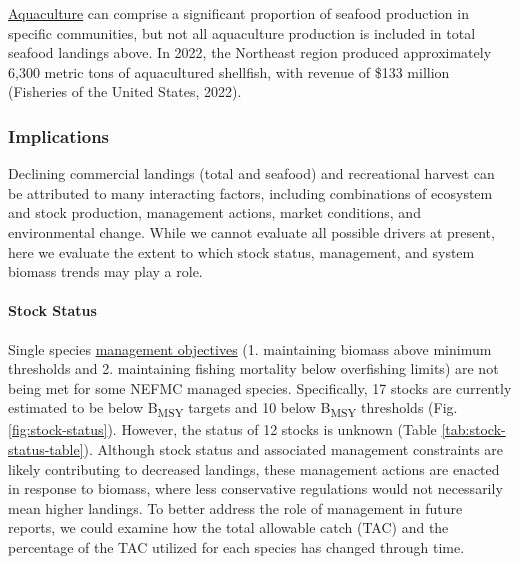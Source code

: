 \documentclass[
  10pt,
]{article}
\begin{document}
\href{https://www.fisheries.noaa.gov/topic/aquaculture}{Aquaculture} can comprise a significant proportion of seafood production in specific communities, but not all aquaculture production is included in total seafood landings above. In 2022, the Northeast region produced approximately 6,300 metric tons of aquacultured shellfish, with revenue of \$133 million (Fisheries of the United States, 2022).

\subsubsection{Implications}\label{implications-1}

Declining commercial landings (total and seafood) and recreational harvest can be attributed to many interacting factors, including combinations of ecosystem and stock production, management actions, market conditions, and environmental change. While we cannot evaluate all possible drivers at present, here we evaluate the extent to which stock status, management, and system biomass trends may play a role.

\paragraph{Stock Status}\label{stock-status}

Single species \href{https://noaa-edab.github.io/catalog/stock_status.html}{management objectives} (1. maintaining biomass above minimum thresholds and 2. maintaining fishing mortality below overfishing limits) are not being met for some NEFMC managed species. Specifically, 17 stocks are currently estimated to be below B\textsubscript{MSY} targets and 10 below B\textsubscript{MSY} thresholds (Fig. \ref{fig:stock-status}). However, the status of 12 stocks is unknown (Table \ref{tab:stock-status-table}). Although stock status and associated management constraints are likely contributing to decreased landings, these management actions are enacted in response to biomass, where less conservative regulations would not necessarily mean higher landings. To better address the role of management in future reports, we could examine how the total allowable catch (TAC) and the percentage of the TAC utilized for each species has changed through time.
\end{document}
